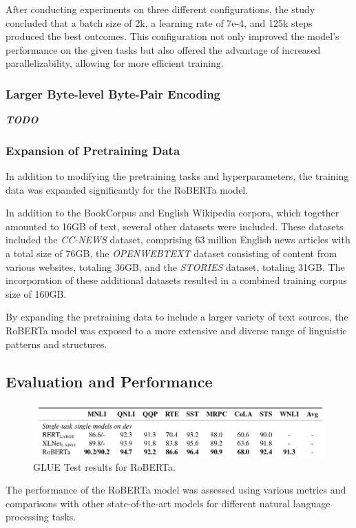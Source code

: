 \documentclass[a4paper,10pt]{report} %
\begin{document}
After conducting experiments on three different configurations, the study concluded that a batch size of 2k, a learning rate of 7e-4, and 125k steps produced the best outcomes. This configuration not only improved the model's performance on the given tasks but also offered the advantage of increased parallelizability, allowing for more efficient training.

\subsubsection{Larger Byte-level Byte-Pair Encoding}
\textit{\textbf{TODO}}

\subsubsection{Expansion of Pretraining Data}
In addition to modifying the pretraining tasks and hyperparameters, the training data was expanded significantly for the RoBERTa model.

In addition to the BookCorpus and English Wikipedia corpora, which together amounted to 16GB of text, several other datasets were included. These datasets included the \textit{CC-NEWS} dataset, comprising 63 million English news articles with a total size of 76GB, the \textit{OPENWEBTEXT} dataset consisting of content from various websites, totaling 36GB, and the \textit{STORIES} dataset, totaling 31GB. The incorporation of these additional datasets resulted in a combined training corpus size of 160GB.

By expanding the pretraining data to include a larger variety of text sources, the RoBERTa model was exposed to a more extensive and diverse range of linguistic patterns and structures.

\subsection{Evaluation and Performance}
\begin{figure}
  \centering
  \includegraphics[width=12cm]{img/roberta_results.png}
  \caption{GLUE Test results for RoBERTa.}
  \label{fig:roberta_results}
\end{figure}
The performance of the RoBERTa model was assessed using various metrics and comparisons with other state-of-the-art models for different natural language processing tasks.
\end{document}
